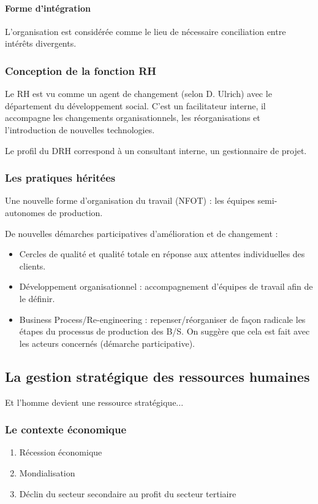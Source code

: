 \documentclass[12pt]{article}
\begin{document}
	\paragraph{Forme d'intégration} L'organisation est considérée comme le lieu de nécessaire conciliation entre intérêts divergents.
	
	\subsubsection{Conception de la fonction RH}

	Le RH est vu comme un \og{} agent de changement\fg{} (selon D. Ulrich) avec le département du développement social. C’est un facilitateur interne, il accompagne les changements organisationnels, les réorganisations et l’introduction de nouvelles technologies.
	
	Le profil du DRH correspond à un consultant interne, un gestionnaire de projet.
	
	\subsubsection{Les pratiques héritées}
	
	Une nouvelle forme d’organisation du travail (NFOT) : les équipes semi-autonomes de production.
	
	De nouvelles démarches participatives d’amélioration et de changement :
	
	\begin{itemize}
		\item Cercles de qualité et qualité totale en réponse aux attentes individuelles des clients.
		\item Développement organisationnel : accompagnement d’équipes de travail afin de le définir.
		\item \og{}Business Process/Re-engineering\fg{} : repenser/réorganiser de façon radicale les étapes du processus de production des B/S. On suggère que cela est fait avec les acteurs concernés (démarche participative).
	\end{itemize}
	
	\subsection{La gestion stratégique des ressources humaines}
	Et l’homme devient une ressource stratégique...
		\subsubsection{Le contexte économique}
		\begin{enumerate}
		 \item Récession économique
		 \item Mondialisation
		 \item Déclin du secteur secondaire au profit du secteur tertiaire
		\end{enumerate}
		
\end{document}
